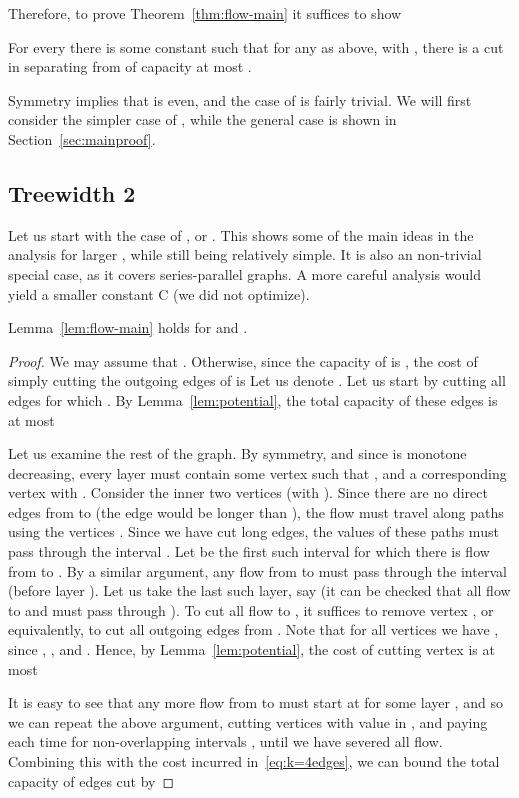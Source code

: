 Therefore, to prove Theorem~\ref{thm:flow-main} it suffices to show
\begin{lemma}\label{lem:flow-main} For every  there is some constant  such that for any  as above, with , there is a cut in  separating  from  of capacity at most .
\end{lemma}

Symmetry implies that  is even, and the case of  is fairly trivial. We will first consider the simpler case of , while the general case is shown in Section~\ref{sec:mainproof}.

\subsection{Treewidth 2}
Let us start with the case of , or . This shows some of the main ideas in the analysis for larger , while still being relatively simple. It is also an non-trivial special case, as it covers series-parallel graphs. A more careful analysis would yield a smaller constant C (we did not optimize).

\begin{lemma}\label{lem:flow-k=4} Lemma~\ref{lem:flow-main} holds for  and .
\end{lemma}
\ifprocs\else
\begin{proof} We may assume that . Otherwise, since the capacity of  is , the cost of simply cutting the outgoing edges of  is  Let us denote . Let us start by cutting all edges  for which . By Lemma~\ref{lem:potential}, the total capacity of these edges is at most


Let us examine the rest of the graph. By symmetry, and since  is monotone decreasing, every layer  must contain some vertex  such that , and a corresponding vertex  with . Consider the inner two vertices  (with ). Since there are no direct edges from  to  (the edge would be longer than ), the flow must travel along paths using the vertices . Since we have cut long edges, the  values of these paths must pass through the interval . Let  be the first such interval for which there is flow from  to . By a similar argument, any flow from  to  must pass through the interval  (before layer ). Let us take the last such layer, say  (it can be checked that all flow to  and  must pass through ). To cut all flow to , it suffices to remove vertex , or equivalently, to cut all outgoing edges from . Note that for all vertices  we have , since , , and . Hence, by Lemma~\ref{lem:potential}, the cost of cutting vertex  is at most


It is easy to see that any more flow from  to  must start at  for some layer , and so we can repeat the above argument, cutting vertices with  value in , and paying   each time for non-overlapping intervals , until we have severed all flow. Combining this with the cost incurred in~\eqref{eq:k=4edges}, we can bound the total capacity of edges cut by 
\end{proof}
\fi

